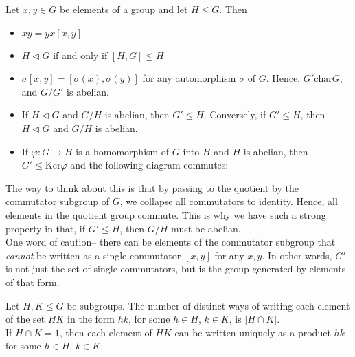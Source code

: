 \documentclass{memoir}
\begin{document}
\begin{prop}
	Let \(x,y \in G\) be elements of a group and let \(H\leq G\). Then
	\begin{itemize}
		\item \(xy = yx[x,y]\)
		\item \(H \triangleleft G\) if and only if \([H,G] \leq H\) 
		\item \(\sigma [x,y] = [\sigma (x),\sigma (y)]\) for any automorphism \(\sigma \) of \(G\). Hence, \(G' \textrm{char}G\), and \(G / G'\) is abelian.
		\item If \(H \triangleleft G\) and \(G/H\) is abelian, then \(G' \leq H\). Conversely, if \(G' \leq H\), then \(H \triangleleft G\) and \(G / H\) is abelian.
		\item If \(\varphi :G\to H\) is a homomorphism of \(G\) into \(H\) and \(H\) is abelian, then \(G' \leq \textrm{Ker}\varphi \) and the following diagram commutes:
\begin{center}
\end{center}
	\end{itemize}
\end{prop}
The way to think about this is that by passing to the quotient by the commutator subgroup of \(G\), we collapse all commutators to identity. Hence, all elements in the quotient group commute. This is why we have such a strong property in that, if \(G' \leq H\), then \(G / H\) must be abelian.\\

One word of caution-- there can be elements of the commutator subgroup that \textit{cannot} be written as a single commutator \([x,y]\) for any \(x,y\). In other words, \(G'\) is not just the set of single commutators, but is the group generated by elements of that form.

\begin{prop}
	Let \(H,K \leq G\) be subgroups. The number of distinct ways of writing each element of the set \(HK\) in the form \(hk\), for some \(h \in H\), \(k \in K\), is \(\left| H \cap K \right| \).\\

	If \(H\cap K = 1\), then each element of \(HK\) can be written uniquely as a product \(hk\) for some \(h \in H\), \(k \in K\).
\end{prop}
\end{document}
